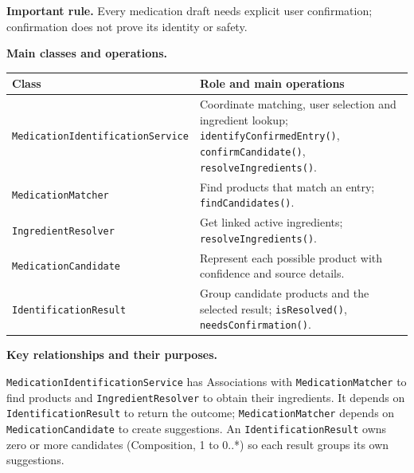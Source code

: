 \documentclass[10pt,letterpaper]{article}
\begin{document}
\noindent\textbf{Important rule.} Every medication draft needs explicit user
confirmation; confirmation does not prove its identity or safety.



\noindent\textbf{Main classes and operations.}\par\smallskip
\begingroup\small
\begin{tabularx}{\textwidth}{|L{0.37\textwidth}|Y|}
\hline
\textbf{Class} & \textbf{Role and main operations} \\ \hline
\texttt{MedicationIdentificationService} & Coordinate matching, user selection and ingredient lookup; \texttt{identifyConfirmedEntry()}, \texttt{confirmCandidate()}, \texttt{resolveIngredients()}. \\ \hline
\texttt{MedicationMatcher} & Find products that match an entry; \texttt{findCandidates()}. \\ \hline
\texttt{IngredientResolver} & Get linked active ingredients; \texttt{resolveIngredients()}. \\ \hline
\texttt{MedicationCandidate} & Represent each possible product with confidence and source details. \\ \hline
\texttt{IdentificationResult} & Group candidate products and the selected result; \texttt{isResolved()}, \texttt{needsConfirmation()}. \\ \hline
\end{tabularx}
\endgroup

\noindent\textbf{Key relationships and their purposes.}\par\smallskip
\texttt{MedicationIdentificationService} has Associations with
\texttt{MedicationMatcher} to find products and \texttt{IngredientResolver}
to obtain their ingredients. It depends on \texttt{IdentificationResult}
to return the outcome; \texttt{MedicationMatcher} depends on
\texttt{MedicationCandidate} to create suggestions. An
\texttt{IdentificationResult} owns zero or more candidates
(Composition, 1 to 0..*) so each result groups its own suggestions.
\end{document}
